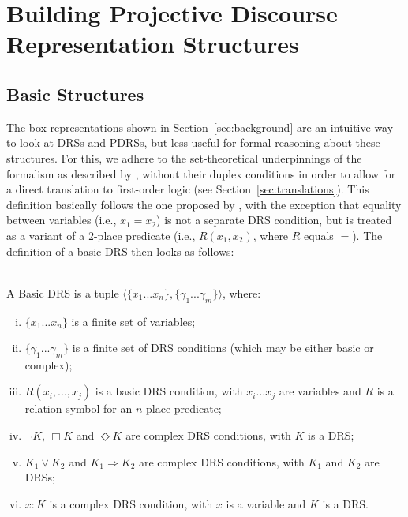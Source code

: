 \section{Building Projective Discourse Representation Structures}
\label{sec:building}


\subsection{Basic Structures}

The box representations shown in Section~\ref{sec:background} are an
intuitive way to look at DRSs and PDRSs, but less useful for formal
reasoning about these structures. For this, we adhere to the set-theoretical
underpinnings of the formalism as described by
, without their duplex conditions in order to
allow for a direct translation to first-order logic (see
Section~\ref{sec:translations}). This definition basically follows the one
proposed by , with the exception that
equality between variables (i.e., $x_1=x_2$) is not a separate DRS
condition, but is treated as a variant of a 2-place predicate (i.e.,
$R(x_1,x_2)$, where $R$ equals $=$). The definition of a basic DRS then
looks as follows:

\begin{definition} \label{def:bDRS}~\\
A Basic DRS is a tuple $\langle \{x_1 ... x_n\},\{\gamma_1 ... \gamma_m\} 
\rangle$, where:
 \begin{enumerate}[i.]
  \item $\{x_1 ... x_n\}$ is a finite set of variables;
  \item $\{\gamma_1 ... \gamma_m\}$ is a finite set of DRS conditions (which
    may be either basic or complex);
  \item\label{def:bDRS:Rel} $R(x_i, ..., x_j)$ is a basic DRS condition,
    with $x_i ... x_j$ are variables and $R$ is a relation symbol for an
    $n$-place predicate;
  \item $\neg K$, $\Box K$ and $\Diamond K$ are complex DRS conditions, with
    $K$ is a DRS;
  \item $K_1 \vee K_2$ and $K_1 \Rightarrow K_2$ are complex DRS conditions,
    with $K_1$ and $K_2$ are DRSs;
  \item \label{def:bDRS:Prop} $x:K$ is a complex DRS condition, with $x$ is
    a variable and $K$ is a DRS.
 \end{enumerate} 
\end{definition}


